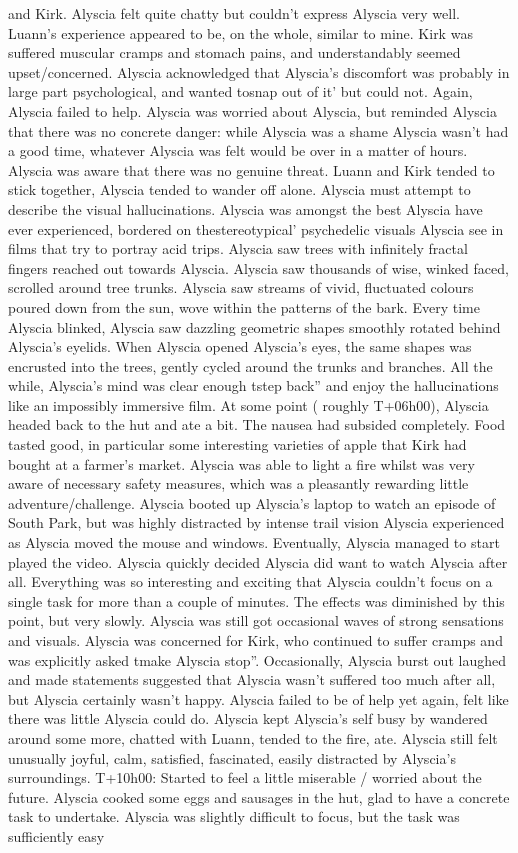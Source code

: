 \documentclass[12pt]{book}
\begin{document}
and Kirk. Alyscia felt quite chatty but couldn't express Alyscia very well. Luann's experience appeared to be, on the whole, similar to mine. Kirk was suffered muscular cramps and stomach pains, and understandably seemed upset/concerned. Alyscia acknowledged that Alyscia's discomfort was probably in large part psychological, and wanted tosnap out of it' but could not. Again, Alyscia failed to help. Alyscia was worried about Alyscia, but reminded Alyscia that there was no concrete danger: while Alyscia was a shame Alyscia wasn't had a good time, whatever Alyscia was felt would be over in a matter of hours. Alyscia was aware that there was no genuine threat. Luann and Kirk tended to stick together, Alyscia tended to wander off alone. Alyscia must attempt to describe the visual hallucinations. Alyscia was amongst the best Alyscia have ever experienced, bordered on thestereotypical' psychedelic visuals Alyscia see in films that try to portray acid trips. Alyscia saw trees with infinitely fractal fingers reached out towards Alyscia. Alyscia saw thousands of wise, winked faced, scrolled around tree trunks. Alyscia saw streams of vivid, fluctuated colours poured down from the sun, wove within the patterns of the bark. Every time Alyscia blinked, Alyscia saw dazzling geometric shapes smoothly rotated behind Alyscia's eyelids. When Alyscia opened Alyscia's eyes, the same shapes was encrusted into the trees, gently cycled around the trunks and branches. All the while, Alyscia's mind was clear enough tstep back'' and enjoy the hallucinations like an impossibly immersive film. At some point ( roughly T+06h00), Alyscia headed back to the hut and ate a bit. The nausea had subsided completely. Food tasted good, in particular some interesting varieties of apple that Kirk had bought at a farmer's market. Alyscia was able to light a fire whilst was very aware of necessary safety measures, which was a pleasantly rewarding little adventure/challenge. Alyscia booted up Alyscia's laptop to watch an episode of South Park, but was highly distracted by intense trail vision Alyscia experienced as Alyscia moved the mouse and windows. Eventually, Alyscia managed to start played the video. Alyscia quickly decided Alyscia did want to watch Alyscia after all. Everything was so interesting and exciting that Alyscia couldn't focus on a single task for more than a couple of minutes. The effects was diminished by this point, but very slowly. Alyscia was still got occasional waves of strong sensations and visuals. Alyscia was concerned for Kirk, who continued to suffer cramps and was explicitly asked tmake Alyscia stop''. Occasionally, Alyscia burst out laughed and made statements suggested that Alyscia wasn't suffered too much after all, but Alyscia certainly wasn't happy. Alyscia failed to be of help yet again, felt like there was little Alyscia could do. Alyscia kept Alyscia's self busy by wandered around some more, chatted with Luann, tended to the fire, ate. Alyscia still felt unusually joyful, calm, satisfied, fascinated, easily distracted by Alyscia's surroundings. T+10h00: Started to feel a little miserable / worried about the future. Alyscia cooked some eggs and sausages in the hut, glad to have a concrete task to undertake. Alyscia was slightly difficult to focus, but the task was sufficiently easy 
\end{document}
